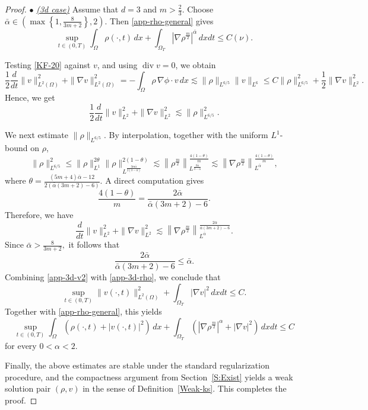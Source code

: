 \documentclass{amsart}
\numberwithin{equation}{section}
\begin{document}
\begin{proof}
\smallskip
\noindent
$\bullet$ \underline{\emph{(3d case)}} Assume that $d=3$ and $m>\frac23$.
Choose
\(
\bar\alpha\in
\left(
\max\left\{1,\frac{8}{3m+2}\right\},2
\right).
\)
Then \eqref{app-rho-general} gives
\begin{equation}\label{app-3d-rho}
\sup_{t\in(0,T)}\int_\Omega \rho(\cdot,t)\,dx
+
\int_{\Omega_T}\left|\nabla \rho^{\frac m2}\right|^{\bar\alpha}\,dxdt
\le
C(\nu).
\end{equation}

Testing \eqref{KF-20} against $v$, and using $\operatorname{div}v=0$, we obtain
\[
\frac12\frac{d}{dt}\|v\|_{L^2(\Omega)}^2+\|\nabla v\|_{L^2(\Omega)}^2
=
-\int_\Omega \rho\,\nabla\phi\cdot v\,dx
\lesssim
\|\rho\|_{L^{6/5}}\|v\|_{L^6}
\le
C\|\rho\|_{L^{6/5}}^2+\frac12\|\nabla v\|_{L^2}^2.
\]
Hence, we get
\begin{equation}\label{app-3d-v1}
\frac12\frac{d}{dt}\|v\|_{L^2}^2+\|\nabla v\|_{L^2}^2
\lesssim
\|\rho\|_{L^{6/5}}^2.
\end{equation}

We next estimate $\|\rho\|_{L^{6/5}}$. By interpolation, together with the uniform $L^1$-bound on $\rho$,
\[
\|\rho\|_{L^{6/5}}^2
\le
\|\rho\|_{L^1}^{2\theta}
\|\rho\|_{L^{\frac{3m\bar\alpha}{2(3-\bar\alpha)}}}^{2(1-\theta)}
\lesssim
\left\|\rho^{\frac m2}\right\|_{L^{\frac{3\bar\alpha}{3-\bar\alpha}}}^{\frac{4(1-\theta)}{m}}
\lesssim
\left\|\nabla \rho^{\frac m2}\right\|_{L^{\bar\alpha}}^{\frac{4(1-\theta)}{m}},
\]
where
$\displaystyle
\theta=\frac{(5m+4)\bar\alpha-12}{2(\bar\alpha(3m+2)-6)}$.
A direct computation gives
\[
\frac{4(1-\theta)}{m}
=
\frac{2\bar\alpha}{\bar\alpha(3m+2)-6}.
\]
Therefore, we have
\begin{equation}\label{app-3d-v2}
\frac{d}{dt}\|v\|_{L^2}^2+\|\nabla v\|_{L^2}^2
\lesssim
\left\|\nabla \rho^{\frac m2}\right\|_{L^{\bar\alpha}}^{\frac{2\bar\alpha}{\bar\alpha(3m+2)-6}}.
\end{equation}
Since
\(
\bar\alpha>\frac{8}{3m+2},
\)
it follows that
\[
\frac{2\bar\alpha}{\bar\alpha(3m+2)-6}\le \bar\alpha.
\]
Combining \eqref{app-3d-v2} with \eqref{app-3d-rho}, we conclude that
\begin{equation}\label{app-3d-v}
\sup_{t\in(0,T)}\|v(\cdot,t)\|_{L^2(\Omega)}^2
+
\int_{\Omega_T}|\nabla v|^2\,dxdt
\le
C.
\end{equation}
Together with \eqref{app-rho-general}, this yields
\[
\sup_{t\in(0,T)}\int_\Omega \left(\rho(\cdot,t)+|v(\cdot,t)|^2\right)\,dx
+
\int_{\Omega_T}\left(\left|\nabla \rho^{\frac m2}\right|^\alpha+|\nabla v|^2\right)\,dxdt
\le
C
\]
for every $0<\alpha<2$.

Finally, the above estimates are stable under the standard regularization procedure, and the compactness argument from Section~\ref{S:Exist} yields a weak solution pair $(\rho,v)$ in the sense of Definition~\ref{Weak-ks}. This completes the proof.
\end{proof}
\end{document}
